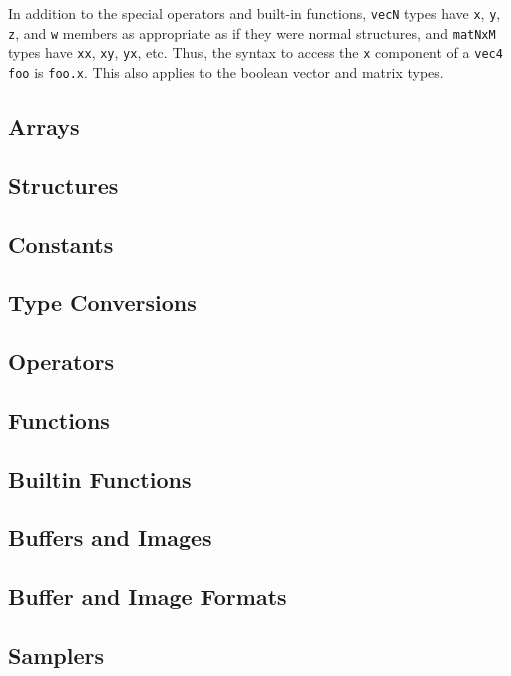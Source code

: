 \documentclass[11pt]{article}
\newcommand{\code}[1]{\texttt{#1}}
\begin{document}
In addition to the special operators and built-in functions, \code{vecN} types have \code{x}, \code{y}, \code{z}, and \code{w} members as appropriate as if they were normal structures, and \code{matNxM} types have \code{xx}, \code{xy}, \code{yx}, etc. Thus, the syntax to access the \code{x} component of a \code{vec4 foo} is \code{foo.x}. This also applies to the boolean vector and matrix types.
\subsection{Arrays}

\subsection{Structures}

\subsection{Constants}

\subsection{Type Conversions}

\subsection{Operators} \label{operators}

\subsection{Functions}

\subsection{Builtin Functions} \label{builtins}

\subsection{Buffers and Images}

\subsection{Buffer and Image Formats}

\subsection{Samplers}
\end{document}
